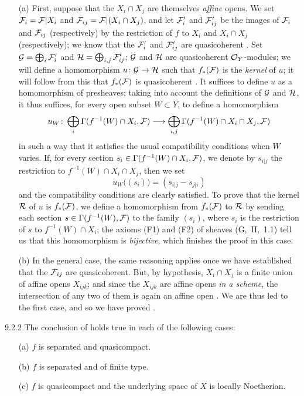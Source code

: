 \begin{itemize}
\item[(a)] First, suppose that the $X_i\cap X_j$
are themselves \emph{affine} opens.  We set $\mathcal{F}_i=\mathcal{F}|X_i$ and
$\mathcal{F}_{ij}=\mathcal{F}|(X_i\cap X_j)$, and let $\mathcal{F}'_i$ and
$\mathcal{F}'_{ij}$ be the images of $\mathcal{F}_i$ and $\mathcal{F}_{ij}$
(respectively) by the restriction of $f$ to $X_i$ and $X_i\cap X_j$
(respectively); we know that the $\mathcal{F}'_i$ and $\mathcal{F}'_{ij}$ are
quasicoherent .  Set $\mathcal{G}=\bigoplus_i\mathcal{F}'_i$ and
$\mathcal{H}=\bigoplus_{i,j}\mathcal{F}'_{ij}$; $\mathcal{G}$ and $\mathcal{H}$ are
quasicoherent $\mathcal{O}_Y$-modules; we will define a homomorphism
$u\colon\mathcal{G}\to\mathcal{H}$ such that $f_\ast(\mathcal{F})$ is the
\emph{kernel} of $u$; it will follow from this that $f_\ast(\mathcal{F})$ is
quasicoherent .  It suffices to define $u$ as a homomorphism
of presheaves; taking into account the definitions of $\mathcal{G}$ and
$\mathcal{H}$, it thus suffices, for every open subset $W\subset Y$, to define a
homomorphism
\[
   {u_W\colon\bigoplus_i\Gamma(f^{-1}(W)\cap X_i,\mathcal{F})}\longrightarrow
   {\bigoplus_{i,j}\Gamma(f^{-1}(W)\cap X_i\cap X_j,\mathcal{F})}
\]
in such a way that it satisfies the usual
compatibility conditions when $W$ varies.  If, for every section
$s_i\in\Gamma(f^{-1}(W)\cap X_i, \mathcal{F})$, we denote by $s_{i|j}$ the
restriction to $f^{-1}(W)\cap X_i\cap X_j$, then we set \[
u_W\big((s_i)\big)=(s_{i|j}-s_{j|i}) \] and the compatibility conditions are
clearly satisfied.  To prove that the kernel $\mathcal{R}$ of $u$ is
$f_\ast(\mathcal{F})$, we define a homomorphism from $f_\ast(\mathcal{F})$ to
$\mathcal{R}$ by sending each section $s\in\Gamma(f^{-1}(W),\mathcal{F})$ to the
family $(s_i)$, where $s_i$ is the restriction of $s$ to $f^{-1}(W)\cap X_i$;
the axioms (F1) and (F2) of sheaves (G,~II,~1.1) tell us that this homomorphism
is \emph{bijective}, which finishes the proof in this case.
\item[(b)] In the general case, the same reasoning applies once we have established
that the $\mathcal{F}_{ij}$ are quasicoherent.  But, by hypothesis, $X_i\cap X_j$ is a
finite union of affine opens $X_{ijk}$; and since the $X_{ijk}$ are affine opens
\emph{in a scheme}, the intersection of any two of them is again an affine open
.  We are thus led to the first case, and so we have proved .
\end{itemize}

\begin{env}[Corollary]{9.2.2}
\label{cor-1.9.2.2}
The conclusion of  holds true in each
of the following cases:
\begin{itemize}
  \item[(a)] $f$ is separated and quasicompact.
  \item[(b)] $f$ is separated and of finite type.
  \item[(c)] $f$ is quasicompact and the underlying space of $X$ is locally Noetherian.
\end{itemize}
\end{env}

